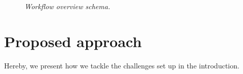\begin{figure}
	\begin{center}
		\caption{\textit{Workflow overview schema.}}
		\label{fig:1}
	\end{center}
	\vspace{-20pt}
\end{figure}
\section{Proposed approach}
Hereby, we present how we tackle the challenges set up in the introduction.
